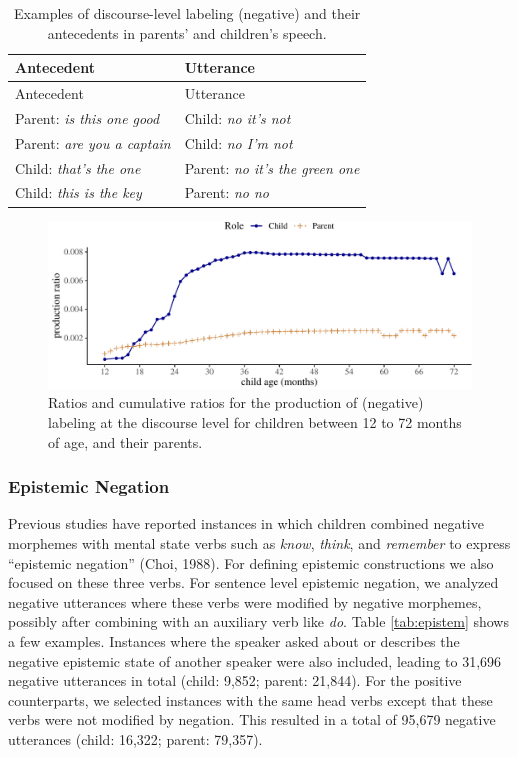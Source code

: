 \documentclass[
  english,
  man,floatsintext]{apa6}
\begin{document}
\begin{longtable}[]{@{}ll@{}}
\caption{\label{tab:dislabel} Examples of discourse-level labeling (negative) and their antecedents in parents' and children's speech.}\tabularnewline
\toprule
Antecedent & Utterance \\
\midrule
\endfirsthead
\toprule
Antecedent & Utterance \\
\midrule
\endhead
Parent: \emph{is this one good} & Child: \emph{no it's not} \\
Parent: \emph{are you a captain} & Child: \emph{no I'm not} \\
Child: \emph{that's the one} & Parent: \emph{no it's the green one} \\
Child: \emph{this is the key} & Parent: \emph{no no} \\
\bottomrule
\end{longtable}

\begin{figure}[H]

{\centering \includegraphics{neg_construction_article_files/figure-latex/learningdiscourse-1} 

}

\caption{Ratios and cumulative ratios for the production of (negative) labeling at the discourse level for children between 12 to 72 months of age, and their parents.}\label{fig:learningdiscourse}
\end{figure}

\hypertarget{epistemic-negation}{%
\subsubsection{Epistemic Negation}\label{epistemic-negation}}

Previous studies have reported instances in which children combined negative morphemes with mental state verbs such as \emph{know}, \emph{think}, and \emph{remember} to express ``epistemic negation'' (Choi, 1988). For defining epistemic constructions we also focused on these three verbs. For sentence level epistemic negation, we analyzed negative utterances where these verbs were modified by negative morphemes, possibly after combining with an auxiliary verb like \emph{do}. Table \ref{tab:epistem} shows a few examples. Instances where the speaker asked about or describes the negative epistemic state of another speaker were also included, leading to 31,696 negative utterances in total (child: 9,852; parent: 21,844). For the positive counterparts, we selected instances with the same head verbs except that these verbs were not modified by negation. This resulted in a total of 95,679 negative utterances (child: 16,322; parent: 79,357).
\end{document}
